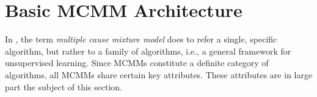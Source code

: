 \section{Basic MCMM Architecture}
\label{sec:architecture}

In \citet{saund:94}, the term \emph{multiple cause mixture model} does to refer a single, 
specific algorithm, but rather to a family of algorithms, i.e., a general framework for unsupervised learning.  Since MCMMs constitute a definite category of algorithms, all MCMMs share certain key attributes. %
These attributes are in large part the subject of this section. 
%




